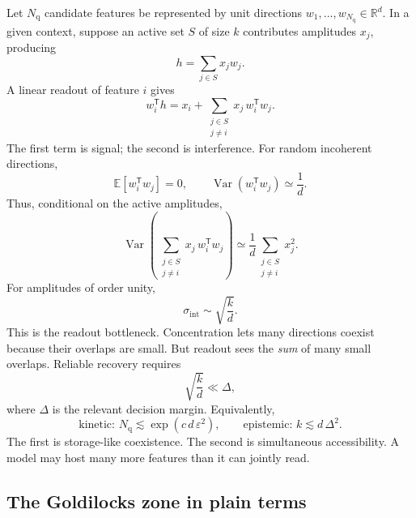 \documentclass[
  aps,
  reprint,
  superscriptaddress,
  floatfix,
  nofootinbib,
  longbibliography
]{revtex4-2}
\newcommand{\R}{\mathbb{R}}
\newcommand{\E}{\mathbb{E}}
\newcommand{\Nq}{N_{\mathrm q}}
\newcommand{\sint}{\sigma_{\mathrm{int}}}
\newcommand{\T}{^{\mathsf{T}}}
\DeclareMathOperator{\Var}{Var}
\begin{document}
Let $\Nq$ candidate features be represented by unit directions
$w_1,\dots,w_{\Nq}\in\R^{d}$. In a given context, suppose an active set
$S$ of size $k$ contributes amplitudes $x_j$, producing
%
\begin{equation}
\label{eq:hidden}
h=\sum_{j\in S}x_j w_j .
\end{equation}
%
A linear readout of feature $i$ gives
%
\begin{equation}
\label{eq:readout}
w_i\T h
=
x_i+
\sum_{\substack{j\in S\\ j\neq i}}
x_j\,w_i\T w_j .
\end{equation}
%
The first term is signal; the second is interference. For random
incoherent directions,
%
\begin{equation}
\label{eq:moments}
\E[w_i\T w_j]=0,
\qquad
\Var(w_i\T w_j)\simeq \frac{1}{d}.
\end{equation}
%
Thus, conditional on the active amplitudes,
%
\begin{equation}
\label{eq:intvar}
\Var\!\left(
\sum_{\substack{j\in S\\ j\neq i}}
x_j\,w_i\T w_j
\right)
\simeq
\frac{1}{d}
\sum_{\substack{j\in S\\ j\neq i}}x_j^2 .
\end{equation}
%
For amplitudes of order unity,
%
\begin{equation}
\label{eq:sint}
\sint\sim\sqrt{\frac{k}{d}} .
\end{equation}
%
This is the readout bottleneck. Concentration lets many directions
coexist because their overlaps are small. But readout sees the
\emph{sum} of many small overlaps. Reliable recovery requires
%
\begin{equation}
\label{eq:snr}
\sqrt{\frac{k}{d}}\ll \Delta,
\end{equation}
%
where $\Delta$ is the relevant decision margin. Equivalently,
%
\begin{equation}
\label{eq:dual}
\text{kinetic: }\Nq\lesssim\exp(c\,d\,\varepsilon^{2}),
\qquad
\text{epistemic: }k\lesssim d\,\Delta^{2}.
\end{equation}
%
The first is storage-like coexistence. The second is simultaneous
accessibility. A model may host many more features than it can jointly
read.

\subsection{The Goldilocks zone in plain terms}
\label{sec:goldilocks}
\end{document}
